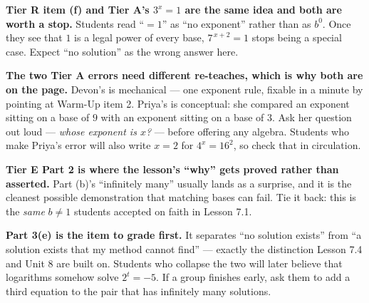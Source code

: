 \documentclass[10pt]{article}
\begin{document}
\begin{teachernote}
\textbf{Tier R item (f) and Tier A's $3^{x}=1$ are the same idea and both are worth a stop.} Students
read ``$=1$'' as ``no exponent'' rather than as $b^{0}$. Once they see that $1$ is a legal power of every
base, $7^{\,x+2}=1$ stops being a special case. Expect ``no solution'' as the wrong answer here.

\textbf{The two Tier A errors need different re-teaches, which is why both are on the page.} Devon's is
mechanical --- one exponent rule, fixable in a minute by pointing at Warm-Up item 2. Priya's is
conceptual: she compared an exponent sitting on a base of $9$ with an exponent sitting on a base of $3$.
Ask her question out loud --- \emph{whose exponent is $x$?} --- before offering any algebra. Students who
make Priya's error will also write $x=2$ for $4^{x}=16^{2}$, so check that in circulation.

\textbf{Tier E Part 2 is where the lesson's ``why'' gets proved rather than asserted.} Part (b)'s
``infinitely many'' usually lands as a surprise, and it is the cleanest possible demonstration that
matching bases can fail. Tie it back: this is the \emph{same} $b\neq1$ students accepted on faith in
Lesson 7.1.

\textbf{Part 3(e) is the item to grade first.} It separates ``no solution exists'' from ``a solution
exists that my method cannot find'' --- exactly the distinction Lesson 7.4 and Unit 8 are built on.
Students who collapse the two will later believe that logarithms somehow solve $2^{t}=-5$. If a group
finishes early, ask them to add a third equation to the pair that has infinitely many solutions.
\end{teachernote}
\end{document}
